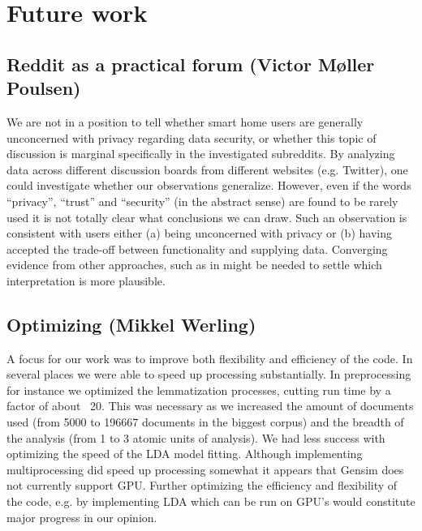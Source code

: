 \documentclass{article}
\begin{document}
    \section{Future work}
    \subsection{Reddit as a practical forum (Victor Møller Poulsen)}
    We are not in a position to tell whether smart home users
are generally unconcerned with privacy regarding data security, or whether this topic
of discussion is marginal specifically in the investigated subreddits. By analyzing data
across different discussion boards from different websites (e.g. Twitter), one could
investigate whether our observations generalize. However, even if the words “privacy”, “trust” and “security” (in the abstract sense) are found to be rarely used it is not totally clear what conclusions we can draw. Such an observation is consistent with users either (a) being unconcerned with privacy or (b) having accepted the trade-off between functionality and supplying data. Converging evidence from other approaches, such as in  might be needed to settle which interpretation is more plausible.
    \subsection{Optimizing (Mikkel Werling)}
    A focus for our work was to improve both flexibility and efficiency of the code. In several places we were able to speed up processing substantially. In preprocessing for instance we optimized the lemmatization processes, cutting run time by a factor of about ~20. This was necessary as we increased the amount of documents used (from 5000 to 196667 documents in the biggest corpus) and the breadth of the analysis (from 1 to 3 atomic units of analysis). We had less success with optimizing the speed of the LDA model fitting. Although implementing multiprocessing did speed up processing somewhat it appears that Gensim does not currently support GPU. Further optimizing the efficiency and flexibility of the code, e.g. by implementing LDA which can be run on GPU’s would constitute major progress in our opinion.
\end{document}
